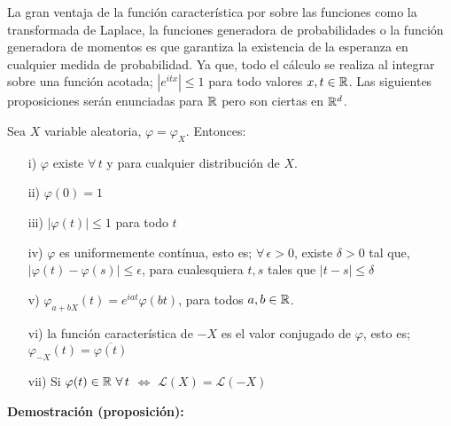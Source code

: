 La gran ventaja de la función característica por sobre las funciones como la transformada de Laplace, la funciones generadora de probabilidades o la función generadora de momentos es que garantiza la existencia de la esperanza en cualquier medida de probabilidad. Ya que, todo el cálculo se realiza al integrar sobre una función acotada; $|e^{itx}|\leq 1$ para todo valores $x,t \in \mathbb R$. Las siguientes proposiciones serán enunciadas para $\mathbb R$ pero son ciertas en $\mathbb R^d$.

\begin{prop} Sea $X$ variable aleatoria, $\varphi = \varphi_X$. Entonces:
\begin{itemize}
    \item[i)] $\varphi$ existe $\forall\,t$ y para cualquier distribución de $X$.
    \item[ii)] $\varphi(0)=1$
    \item[iii)] $|\varphi(t)|\leq 1$ para todo $t$
    \item[iv)] $\varphi$ es uniformemente contínua, esto es; $\forall\,\epsilon >0$, existe $\delta >0$ tal que, $|\varphi(t)-\varphi(s)|\leq \epsilon$, para cualesquiera $t, s$ tales que $|t-s|\leq \delta$
    \item[v)] $\varphi_{a +bX}(t) = e^{iat}\varphi(bt)$, para todos $a,b\in\mathbb R$.
    \item[vi)] la función característica de $-X$ es el valor conjugado de $\varphi$, esto es; $\varphi_{-X}(t) = \overline{\varphi(t)}$
    \item[vii)] Si $\varphi(t)\in \mathbb R\,\,\forall\,t$ $\Longleftrightarrow$ $\mathcal{L}(X) = \mathcal{L}(-X)$
\end{itemize}
\end{prop}
\textbf{Demostración (proposición):}
